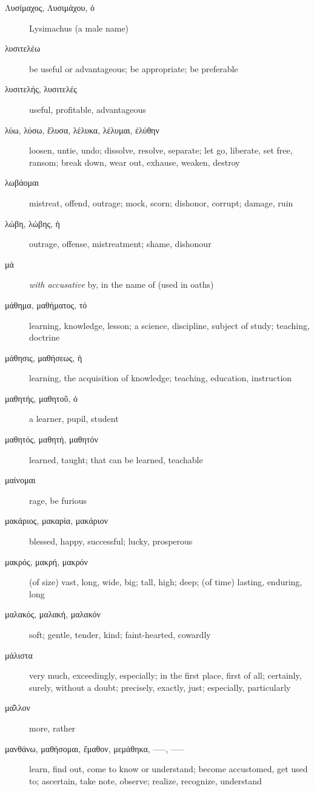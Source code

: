 \documentclass[12pt,letterpaper]{article}
\begin{document}
\begin{description}
    \item[\textgreek{Λυσίμαχος, Λυσιμάχου, ὁ}] Lysimachus (a male name)
    \item[\textgreek{λυσιτελέω}] be useful or advantageous; be appropriate; be preferable
    \item[\textgreek{λυσιτελής, λυσιτελές}] useful, profitable, advantageous
    \item[\textgreek{λύω, λύσω, ἔλυσα, λέλυκα, λέλυμαι, ἐλύθην}] \marginnote{*}loosen, untie, undo; dissolve, resolve, separate; let go, liberate, set free, ransom; break down, wear out, exhause, weaken, destroy
    \item[\textgreek{λωβάομαι}] mistreat, offend, outrage; mock, scorn; dishonor, corrupt; damage, ruin
    \item[\textgreek{λώβη, λώβης, ἡ}] outrage, offense, mistreatment; shame, dishonour
    \item[\textgreek{μά}] \textit{with accusative} by, in the name of (used in oaths)
    \item[\textgreek{μάθημα, μαθήματος, τό}] learning, knowledge, lesson; a science, discipline, subject of study; teaching, doctrine
    \item[\textgreek{μάθησις, μαθήσεως, ἡ}] learning, the acquisition of knowledge; teaching, education, instruction
    \item[\textgreek{μαθητής, μαθητοῦ, ὁ}] a learner, pupil, student
    \item[\textgreek{μαθητός, μαθητή, μαθητόν}] learned, taught; that can be learned, teachable
    \item[\textgreek{μαίνομαι}] rage, be furious
    \item[\textgreek{μακάριος, μακαρία, μακάριον}] blessed, happy, successful; lucky, prosperous
    \item[\textgreek{μακρός, μακρή, μακρόν}] \marginnote{*}(of size) vast, long, wide, big; tall, high; deep; (of time) lasting, enduring, long
    \item[\textgreek{μαλακός, μαλακή, μαλακόν}] soft; gentle, tender, kind; faint-hearted, cowardly
    \item[\textgreek{μάλιστα}] \marginnote{*}very much, exceedingly, especially; in the first place, first of all; certainly, surely, without a doubt; precisely, exactly, just; especially, particularly
    \item[\textgreek{μα̂λλον}] \marginnote{*}more, rather
    \item[\textgreek{μανθάνω, μαθήσομαι, ἔμαθον, μεμάθηκα, –––, –––}] \marginnote{*}learn, find out, come to know or understand; become accustomed, get used to; ascertain, take note, observe; realize, recognize, understand

\end{description}
\end{document}
